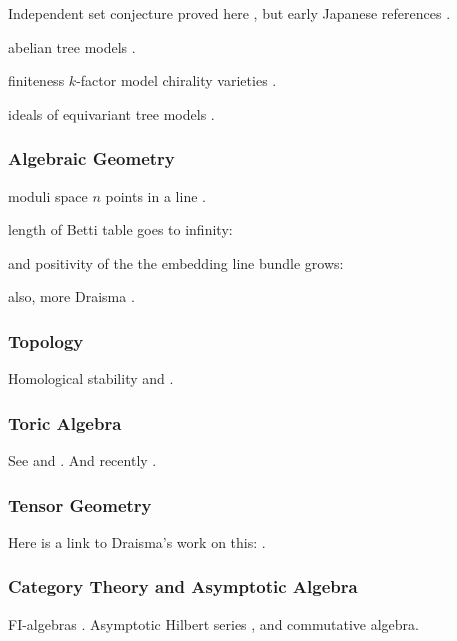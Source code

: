 Independent set conjecture proved here \cite{hillar2012finite}, but early Japanese references \cite{}.

abelian tree models \cite{draisma2015finiteness}.

finiteness $k$-factor model chirality varieties \cite{Draisma08b}.

ideals of equivariant tree models \cite{draisma2009ideals}.

\subsubsection{Algebraic Geometry}

moduli space $n$ points in a line \cite{howard2009equations}.

length of Betti table goes to infinity: \cite{ein2015asymptotics}

and positivity of the the embedding line bundle grows: \cite{ein2012asymptotic}

also, more Draisma \cite{draisma2015plucker}.

\subsubsection{Topology}

Homological stability \cite{randal2013homological} and \cite{church2012homological}.


\subsubsection{Toric Algebra}



See \cite{Hillar13, hillar2016corrigendum} and \cite{draisma2013noetherianity}.  And recently \cite{KKL:equivariant-markov}.

\subsubsection{Tensor Geometry}

Here is a link to Draisma's work on this:  \cite{draisma2014bounded}.

\subsubsection{Category Theory and Asymptotic Algebra}

FI-algebras \cite{church2014fi, church2015fi}.  Asymptotic Hilbert series \cite{Nagel}, \cite{krone2016hilbert} and commutative algebra. 

